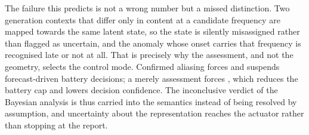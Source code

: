 The failure this predicts is not a wrong number but a missed distinction. Two
generation contexts that differ only in content at a candidate frequency are
mapped towards the same latent state, so the state is silently misassigned
rather than flagged as uncertain, and the anomaly whose onset carries that
frequency is recognised late or not at all. That is precisely why the
assessment, and not the geometry, selects the control mode. Confirmed aliasing
forces  and suspends forecast-driven battery decisions; a
merely  assessment forces ,
which reduces the battery cap and lowers decision confidence. The inconclusive
verdict of the Bayesian analysis is thus carried into the semantics instead of
being resolved by assumption, and uncertainty about the representation reaches
the actuator rather than stopping at the report.
